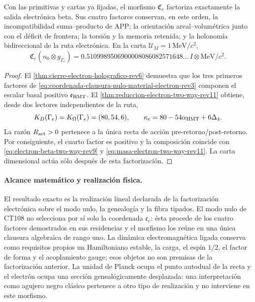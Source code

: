 \begin{theorem}
\label{thm:clausura-nulo-material-electron-rev3}
Con las primitivas y cartas ya fijadas, el morfismo
\(\mathfrak C_e\) factoriza exactamente la salida electrónica beta. Sus
cuatro factores conservan, en este orden, la incompatibilidad suma--producto
de APP; la orientación areal--volumétrica junto con el déficit de frontera;
la torsión y la memoria retenida; y la holonomía bidireccional de la ruta
electrónica. En la carta \(\mathcal U_M=1\,\mathrm{MeV}/c^2\),
\begin{equation}
 \mathfrak C_e(n_0\otimes g_{\Gamma_e})
 =0.5109989506900008086082571648\ldots\,
  I\otimes\mathrm{MeV}/c^2.
 \label{eq:masa-clausura-nulo-material-electron-rev3}
\end{equation}
\end{theorem}

\begin{proof}
El \cref{thm:cierre-electron-holografico-rev6} demuestra que los tres
primeros factores de
\eqref{eq:coordenada-clausura-nulo-material-electron-rev3} componen el
escalar basal positivo \(\mathfrak e_{\rm HMT}\). El
\cref{thm:reduccion-electron-two-way-rev11} obtiene, desde dos lectores
independientes de la ruta,
\[
 K_D(\Gamma_e)=K_\Omega(\Gamma_e)=(80,54,6),
 \qquad
 \kappa_e=80-54\alpha_{\rm HMT}+6\Delta_4.
\]
La razón \(R_{\rm act}>0\) pertenece a la única recta de acción
pre-retorno/post-retorno. Por consiguiente, el cuarto factor es positivo y
la composición coincide con
\eqref{eq:electron-beta-two-way-rev9} y
\eqref{eq:masa-electron-two-way-rev11}. La carta dimensional actúa sólo
después de esta factorización.
\end{proof}

\paragraph{Alcance matemático y realización física.}
El resultado exacto es la realización lineal declarada de la factorización
electrónica sobre el modo nulo, la genealogía y la fibra tipados. El modo
nulo de CT108 no selecciona por sí solo la coordenada \(\mathfrak c_e\):
ésta procede de los cuatro factores demostrados en sus residencias y el
morfismo los reúne en una única clausura algebraica de rango uno. La dinámica electromagnética
ligada conserva como requisitos propios un Hamiltoniano estable, la carga,
el espín \(1/2\), el factor de forma y el acoplamiento gauge; esos objetos no
son premisas de la factorización anterior. La unidad de Planck ocupa el
punto autodual de la recta y el electrón ocupa una sección genealógicamente
desplazada: una interpretación como agujero negro clásico pertenece a otro
tipo de realización y no interviene en este morfismo.
